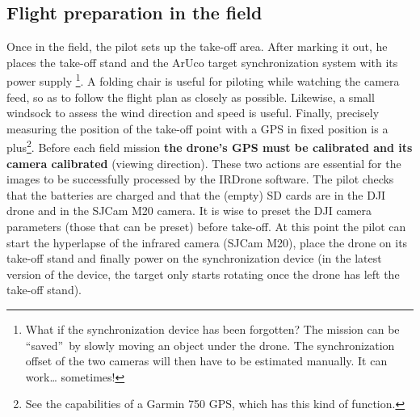 \documentclass[a4paper,11pt]{report}
\begin{document}
\subsection{Flight preparation in the field}
Once in the field, the pilot sets up the take-off area. After marking it out, he places the take-off stand and the ArUco target synchronization system with its power supply
\footnote{What if the synchronization device has been forgotten? The mission can be ``saved''~by slowly moving an object under the drone. The synchronization offset of the two cameras will then have to be estimated manually. It can work\dots{} sometimes!}.
A folding chair is useful for piloting while watching the camera feed, so as to follow the flight plan as closely as possible.
Likewise, a small windsock to assess the wind direction and speed is useful.
Finally, precisely measuring the position of the take-off point with a GPS in fixed position is a plus\footnote{See the capabilities of a Garmin 750 GPS, which has this kind of function.}.
Before each field mission \textbf{the drone's GPS must be calibrated and its camera calibrated} (viewing direction).
These two actions are essential for the images to be successfully processed by the IRDrone software.
The pilot checks that the batteries are charged and that the (empty) SD cards are in the DJI drone and in the SJCam M20 camera.
It is wise to preset the DJI camera parameters (those that can be preset) before take-off.
At this point the pilot can start the hyperlapse of the infrared camera (SJCam M20), place the drone on its take-off stand and finally power on the synchronization device (in the latest version of the device, the target only starts rotating once the drone has left the take-off stand).
\end{document}

